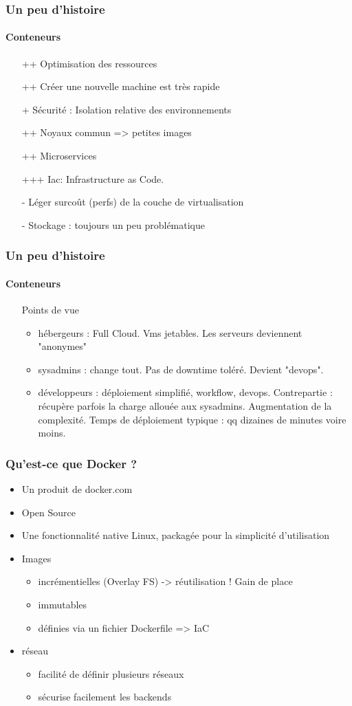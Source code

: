 \documentclass[11pt]{beamer}
\begin{document}
\begin{frame}
\frametitle{Un peu d'histoire}
\framesubtitle{Conteneurs}
\begin{itemize}
	\item[++] Optimisation des ressources
	\item[++] Créer une nouvelle machine est très rapide
	\item[+] Sécurité : Isolation relative des environnements
	\item[++] Noyaux commun => petites images 
	\item[++] Microservices
	\item[+++] Iac: Infrastructure as Code. 
	\item[-] Léger surcoût (perfs) de la couche de virtualisation
	\item[-] Stockage : toujours un peu problématique
\end{itemize}
\end{frame}

\begin{frame}
\frametitle{Un peu d'histoire}
\framesubtitle{Conteneurs}
\begin{itemize}
	\item[] Points de vue
	\begin{itemize}
		\item hébergeurs : Full Cloud. Vms jetables. Les serveurs deviennent "anonymes"
		\item sysadmins : change tout. Pas de downtime toléré. Devient "devops". 
		\item développeurs : déploiement simplifié, workflow, devops. Contrepartie : récupère parfois la charge allouée aux sysadmins. Augmentation de la complexité. Temps de déploiement typique : qq dizaines de minutes voire moins.
	\end{itemize}
\end{itemize}
\end{frame}

\begin{frame}
\frametitle{Qu'est-ce que Docker ?}
\begin{itemize}
	\item Un produit de docker.com
	\item Open Source
	\item Une fonctionnalité native Linux, packagée pour la simplicité d'utilisation
	\item Images 
	\begin{itemize}
		\item incrémentielles (Overlay FS) -> réutilisation ! Gain de place
		\item immutables
		\item définies via un fichier Dockerfile => IaC
	\end{itemize}
	\item réseau
	\begin{itemize}
		\item facilité de définir plusieurs réseaux
		\item sécurise facilement les backends
	\end{itemize}
\end{itemize}
\end{frame}
\end{document}
